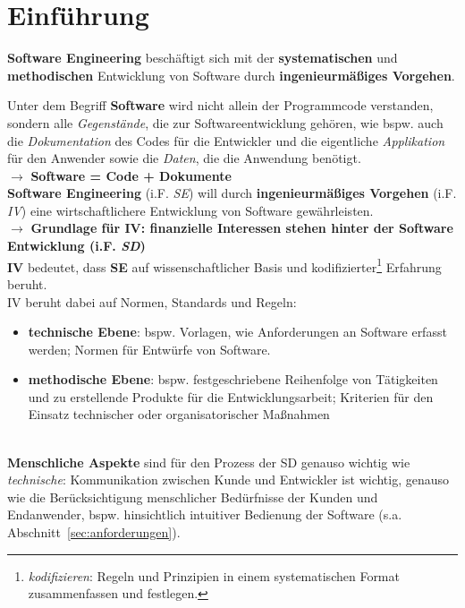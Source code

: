 \section{Einführung}\label{sec:einfuhrung}

\begin{tcolorbox}[title={Software Engineering}]
    \textbf{Software Engineering} beschäftigt sich mit der \textbf{systematischen} und \textbf{methodischen} Entwicklung von Software durch \textbf{ingenieurmäßiges Vorgehen}.
\end{tcolorbox}

\noindent
Unter dem Begriff \textbf{Software} wird nicht allein der Programmcode verstanden, sondern alle \textit{Gegenstände}, die zur Softwareentwicklung gehören, wie bspw. auch die \textit{Dokumentation} des Codes für die Entwickler und die eigentliche \textit{Applikation} für den Anwender sowie die \textit{Daten}, die die Anwendung benötigt.\\
$\rightarrow$ \textbf{Software = Code + Dokumente}\\


\noindent
\textbf{Software Engineering} (i.F. \textit{SE}) will durch \textbf{ingenieurmäßiges Vorgehen} (i.F. \textit{IV}) eine wirtschaftlichere Entwicklung von Software gewährleisten.\\
$\rightarrow$ \textbf{Grundlage für IV: finanzielle Interessen stehen hinter der Software Entwicklung (i.F. \textit{SD})}\\

\noindent
\textbf{IV} bedeutet, dass \textbf{SE} auf wissenschaftlicher Basis und kodifizierter\footnote{
\textit{kodifizieren}: Regeln und Prinzipien in einem systematischen Format zusammenfassen und festlegen.
} Erfahrung beruht.\\

\noindent
IV beruht dabei auf Normen, Standards und Regeln:

\begin{itemize}
    \item\textbf{technische Ebene}: bspw. Vorlagen, wie Anforderungen an Software erfasst werden; Normen für Entwürfe von Software.
    \item \textbf{methodische Ebene}: bspw. festgeschriebene Reihenfolge von Tätigkeiten und zu erstellende Produkte für die Entwicklungsarbeit; Kriterien für den Einsatz technischer oder organisatorischer Maßnahmen
\end{itemize}\\

\noindent
\textbf{Menschliche Aspekte} sind für den Prozess der SD genauso wichtig wie \textit{technische}: Kommunikation zwischen Kunde und Entwickler ist wichtig, genauso wie die Berücksichtigung menschlicher Bedürfnisse der Kunden und Endanwender, bspw. hinsichtlich intuitiver Bedienung der Software (s.a. Abschnitt~\ref{sec:anforderungen}).